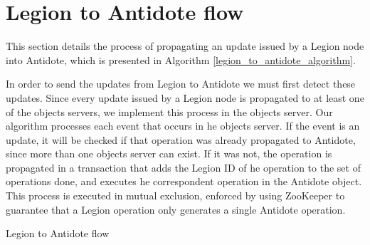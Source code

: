 \section{Legion to Antidote flow}
\label{sec:legion_to_antidote_flow}
This section details the process of propagating an update issued by a Legion node into Antidote, which is presented in Algorithm \ref{legion_to_antidote_algorithm}.\par
	In order to send the updates from Legion to Antidote we must first detect these updates. Since every update issued by a Legion node is propagated to at least one of the objects servers, we implement this process in the objects server. Our algorithm processes each event that occurs in he objects server. If the event is an update, it will be checked if that operation was already propagated to Antidote, since more than one objects server can exist. If it was not, the operation is propagated in a transaction that adds the Legion ID of he operation to the set of operations done, and executes he correspondent operation in the Antidote object. This process is executed in mutual exclusion, enforced by using ZooKeeper to guarantee that a Legion operation only generates a single Antidote operation.
	
\begin{algorithm}
\caption{Legion to Antidote flow}
\label{legion_to_antidote_algorithm}
\begin{algorithmic}[1]
    \EndIf
  \EndIf
\End
\end{algorithmic}
\end{algorithm}

